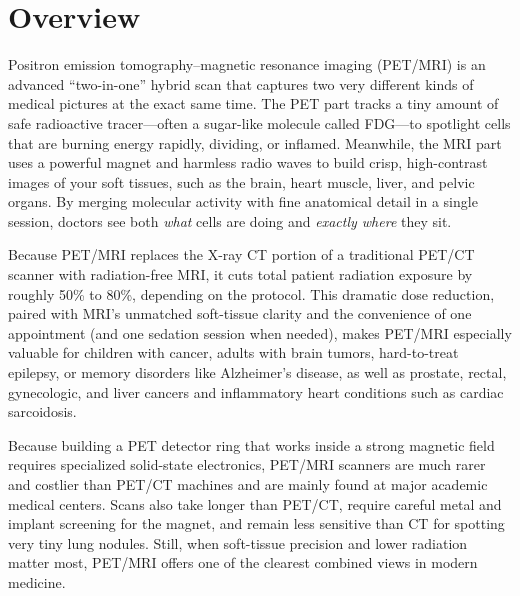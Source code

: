 \label{ch:infographic-pet-mri}

\section{Overview}

Positron emission tomography--magnetic resonance imaging (PET/MRI) is an advanced ``two-in-one'' hybrid scan that captures two very different kinds of medical pictures at the exact same time. The PET part tracks a tiny amount of safe radioactive tracer---often a sugar-like molecule called FDG---to spotlight cells that are burning energy rapidly, dividing, or inflamed. Meanwhile, the MRI part uses a powerful magnet and harmless radio waves to build crisp, high-contrast images of your soft tissues, such as the brain, heart muscle, liver, and pelvic organs. By merging molecular activity with fine anatomical detail in a single session, doctors see both \textit{what} cells are doing and \textit{exactly where} they sit.

Because PET/MRI replaces the X-ray CT portion of a traditional PET/CT scanner with radiation-free MRI, it cuts total patient radiation exposure by roughly 50\% to 80\%, depending on the protocol. This dramatic dose reduction, paired with MRI's unmatched soft-tissue clarity and the convenience of one appointment (and one sedation session when needed), makes PET/MRI especially valuable for children with cancer, adults with brain tumors, hard-to-treat epilepsy, or memory disorders like Alzheimer's disease, as well as prostate, rectal, gynecologic, and liver cancers and inflammatory heart conditions such as cardiac sarcoidosis.

Because building a PET detector ring that works inside a strong magnetic field requires specialized solid-state electronics, PET/MRI scanners are much rarer and costlier than PET/CT machines and are mainly found at major academic medical centers. Scans also take longer than PET/CT, require careful metal and implant screening for the magnet, and remain less sensitive than CT for spotting very tiny lung nodules. Still, when soft-tissue precision and lower radiation matter most, PET/MRI offers one of the clearest combined views in modern medicine.

